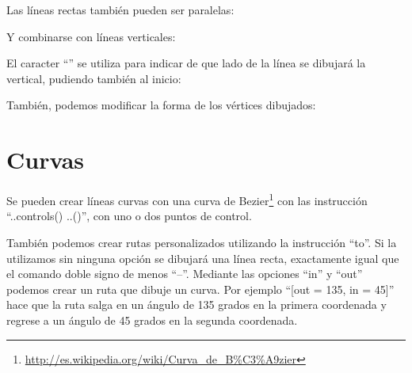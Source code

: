 \documentclass{article}
\begin{document}
Las líneas rectas también pueden ser paralelas:


Y combinarse con líneas verticales:


El caracter ``\textbar'' se utiliza para indicar de que lado de la línea se dibujará la vertical, pudiendo también al inicio:


También, podemos modificar la forma de los vértices dibujados:

 
\section*{Curvas}

Se pueden crear líneas curvas con una curva de Bezier\footnote{\url{http://es.wikipedia.org/wiki/Curva\_de\_B\%C3\%A9zier}} con las instrucción ``..controls() ..()'', con uno o dos puntos de control.
 

También podemos crear rutas personalizados utilizando la instrucción ``to''. Si la utilizamos sin ninguna opción se dibujará una línea recta, exactamente igual que el comando doble signo de menos ``--''. Mediante las opciones ``in'' y ``out'' podemos crear un ruta que dibuje un curva. Por ejemplo ``[out = 135, in = 45]'' hace que la ruta salga en un ángulo de 135 grados en la primera coordenada y regrese a un ángulo de 45 grados en la segunda coordenada.

\end{document}
